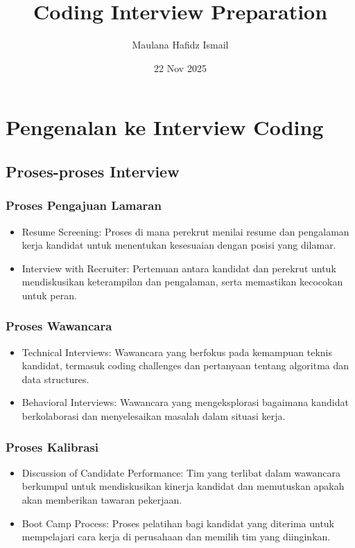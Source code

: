 \documentclass{article}
\title{Coding Interview Preparation}
\date{22 Nov 2025}
\author{Maulana Hafidz Ismail}
\begin{document}
\maketitle
\newpage

\tableofcontents
\newpage
{}

\section{Pengenalan ke Interview Coding}
\subsection{Proses-proses Interview}
\subsubsection{Proses Pengajuan Lamaran}
\begin{itemize}
    \item Resume Screening: Proses di mana perekrut menilai resume dan pengalaman kerja kandidat untuk menentukan kesesuaian dengan posisi yang dilamar.
    \item Interview with Recruiter: Pertemuan antara kandidat dan perekrut untuk mendiskusikan keterampilan dan pengalaman, serta memastikan kecocokan untuk peran.
\end{itemize}

\subsubsection{Proses Wawancara}
\begin{itemize}
    \item Technical Interviews: Wawancara yang berfokus pada kemampuan teknis kandidat, termasuk coding challenges dan pertanyaan tentang algoritma dan data structures.
    \item Behavioral Interviews: Wawancara yang mengeksplorasi bagaimana kandidat berkolaborasi dan menyelesaikan masalah dalam situasi kerja.
\end{itemize}

\subsubsection{Proses Kalibrasi}
\begin{itemize}
    \item Discussion of Candidate Performance: Tim yang terlibat dalam wawancara berkumpul untuk mendiskusikan kinerja kandidat dan memutuskan apakah akan memberikan tawaran pekerjaan.
    \item Boot Camp Process: Proses pelatihan bagi kandidat yang diterima untuk mempelajari cara kerja di perusahaan dan memilih tim yang diinginkan.
\end{itemize}
\end{document}
